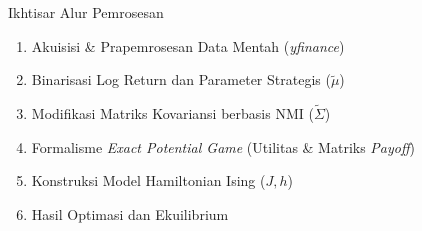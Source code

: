 \frame{\titlepage}

\begin{frame}{Ikhtisar Alur Pemrosesan}
\begin{enumerate}
    \item Akuisisi \& Prapemrosesan Data Mentah (\textit{yfinance})
    \item Binarisasi Log Return dan Parameter Strategis ($\tilde{\mu}$)
    \item Modifikasi Matriks Kovariansi berbasis NMI ($\tilde{\Sigma}$)
    \item Formalisme \textit{Exact Potential Game} (Utilitas \& Matriks \textit{Payoff})
    \item Konstruksi Model Hamiltonian Ising ($J, h$)
    \item Hasil Optimasi dan Ekuilibrium
\end{enumerate}
\end{frame}
